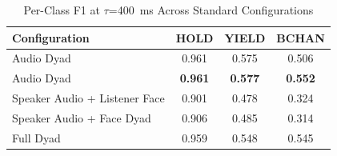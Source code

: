 \begin{table}[h]
\caption{Per-Class F1 at $\tau$=400~ms Across Standard Configurations}
\label{tab:f1_per_class_standard}
\small
\renewcommand{\arraystretch}{1.20}
\begin{tabular}{>{\raggedright\arraybackslash}p{4cm}ccc}
\toprule
Configuration & HOLD & YIELD & BCHAN \\
\midrule
Audio Dyad & 0.961 & 0.575 & 0.506 \\
Audio Dyad & \textbf{0.961} & \textbf{0.577} & \textbf{0.552} \\
Speaker Audio + Listener Face & 0.901 & 0.478 & 0.324 \\
Speaker Audio + Face Dyad & 0.906 & 0.485 & 0.314 \\
Full Dyad & 0.959 & 0.548 & 0.545 \\
\bottomrule
\end{tabular}
\end{table}
